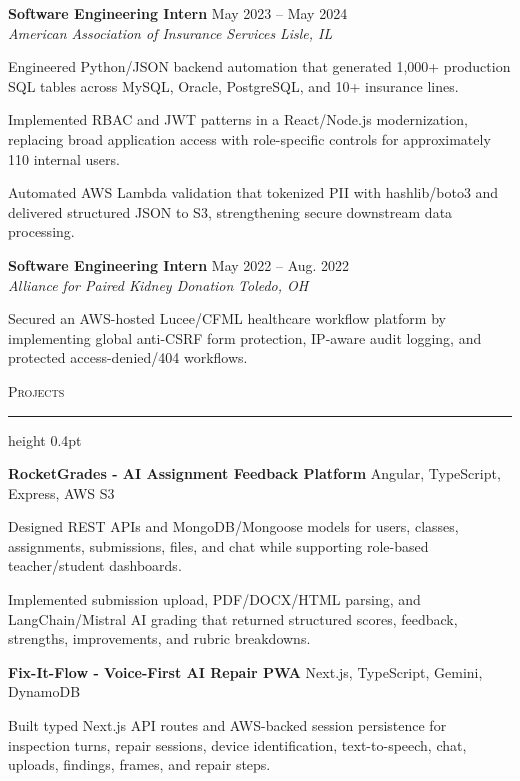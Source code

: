 \documentclass[letterpaper,11pt]{article}
\newcommand{\resumesection}[1]{%
  \par\vspace{2pt}%
  {\large\scshape #1}\par\vspace{2pt}%
  \hrule height 0.4pt\vspace{2pt}%
}
\newcommand{\resumeSubheading}[4]{
  \textbf{#1} \hfill #2\\
  \textit{#3} \hfill \textit{#4}
}
\newcommand{\projectHeading}[2]{
  \textbf{#1} \hfill #2
}
\begin{document}
\resumeSubheading
{Software Engineering Intern}{May 2023 -- May 2024}
{American Association of Insurance Services}{Lisle, IL}
\begin{tightitemize}
  \item Engineered Python/JSON backend automation that generated 1,000+ production SQL tables across MySQL, Oracle, PostgreSQL, and 10+ insurance lines.
  \item Implemented RBAC and JWT patterns in a React/Node.js modernization, replacing broad application access with role-specific controls for approximately 110 internal users.
  \item Automated AWS Lambda validation that tokenized PII with hashlib/boto3 and delivered structured JSON to S3, strengthening secure downstream data processing.
\end{tightitemize}

\resumeSubheading
{Software Engineering Intern}{May 2022 -- Aug. 2022}
{Alliance for Paired Kidney Donation}{Toledo, OH}
\begin{tightitemize}
  \item Secured an AWS-hosted Lucee/CFML healthcare workflow platform by implementing global anti-CSRF form protection, IP-aware audit logging, and protected access-denied/404 workflows.
\end{tightitemize}

\resumesection{Projects}
\projectHeading{RocketGrades - AI Assignment Feedback Platform}{Angular, TypeScript, Express, AWS S3}
\begin{tightitemize}
  \item Designed REST APIs and MongoDB/Mongoose models for users, classes, assignments, submissions, files, and chat while supporting role-based teacher/student dashboards.
  \item Implemented submission upload, PDF/DOCX/HTML parsing, and LangChain/Mistral AI grading that returned structured scores, feedback, strengths, improvements, and rubric breakdowns.
\end{tightitemize}

\projectHeading{Fix-It-Flow - Voice-First AI Repair PWA}{Next.js, TypeScript, Gemini, DynamoDB}
\begin{tightitemize}
  \item Built typed Next.js API routes and AWS-backed session persistence for inspection turns, repair sessions, device identification, text-to-speech, chat, uploads, findings, frames, and repair steps.
\end{tightitemize}
\end{document}
